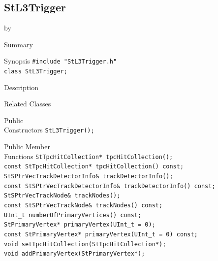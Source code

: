 \documentclass[twoside]{article}
\newcommand{\entrylabel}[1]{\mbox{\textbf{{#1}}}\hfil}%
\newenvironment{entry}
{\begin{list}{}%
    {\renewcommand{\makelabel}{\entrylabel}%
     \setlength{\labelwidth}{90pt}%
     \setlength{\leftmargin}{\labelwidth}
     \advance\leftmargin by \labelsep%
      }%
    }%
  {\end{list}}
\newcommand{\Entrylabel}[1]%
{\raisebox{0pt}[1ex][0pt]{\makebox[\labelwidth][l]%
    {\parbox[t]{\labelwidth}{\hspace{0pt}\textbf{{#1}}}}}}
\newenvironment{Entry}%
{\renewcommand{\entrylabel}{\Entrylabel}\begin{entry}}%
  {\end{entry}}
\begin{document}
\subsection{StL3Trigger}
\label{sec:StL3Trigger}
\begin{Entry}
\item[Summary]
\item[Synopsis]
    \verb+#include "StL3Trigger.h"+\\
    \verb+class StL3Trigger;+\\
\item[Description]
\item[Related Classes]
\item[Public\\ Constructors]
    \verb+StL3Trigger();+\\
\item[Public Member\\ Functions]
    \verb+StTpcHitCollection* tpcHitCollection();+\\
    \verb+const StTpcHitCollection* tpcHitCollection() const;+\\

    \verb+StSPtrVecTrackDetectorInfo& trackDetectorInfo();+\\
    \verb+const StSPtrVecTrackDetectorInfo& trackDetectorInfo() const;+\\

    \verb+StSPtrVecTrackNode& trackNodes();+\\
    \verb+const StSPtrVecTrackNode& trackNodes() const;+\\

    \verb+UInt_t numberOfPrimaryVertices() const;+\\
    \verb+StPrimaryVertex* primaryVertex(UInt_t = 0);+\\
    \verb+const StPrimaryVertex* primaryVertex(UInt_t = 0) const;+\\

    \verb+void setTpcHitCollection(StTpcHitCollection*);+\\
    \verb+void addPrimaryVertex(StPrimaryVertex*);+\\
\end{Entry}
\clearpage
\end{document}
